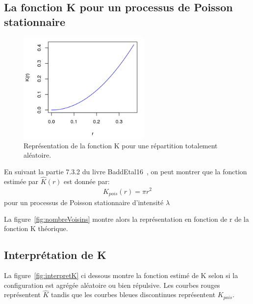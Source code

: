 \documentclass[stage2a]{tnreport}
\begin{document}

\subsection{La fonction K pour un processus de Poisson stationnaire}

\begin{figure}
\vspace{-0.8cm}
\begin{center}
\includegraphics[width=6.5cm]{figures/Kpoiss2.png}
\caption{Représentation de la fonction K pour une répartition totalement aléatoire.}
\label{fig:Kpoiss}
\end{center}
\end{figure} 

En suivant la partie 7.3.2 du livre BaddEtal16~\cite{BaddEtal16}, on peut montrer que la fonction estimée par \begin{math}\hat{K}(r)\end{math} est donnée par:
\begin{align*} K_{pois}(r) = \pi r^2 \end{align*}
pour un processus de Poisson stationnaire d'intensité \begin{math}\lambda\end{math}

La figure~\ref{fig:nombreVoisins} montre alors la représentation en fonction de r de la fonction K théorique.


\vspace{0.5cm}
\subsection{Interprétation de K}
La figure~\ref{fig:interpretK} ci dessous montre la fonction estimé de K selon si la configuration est agrégée aléatoire ou bien répulsive. Les courbes rouges représentent \begin{math}\hat{K}\end{math} tandis que les courbes bleues discontinues représentent \begin{math}K_{pois}\end{math}.\\
\end{document}
